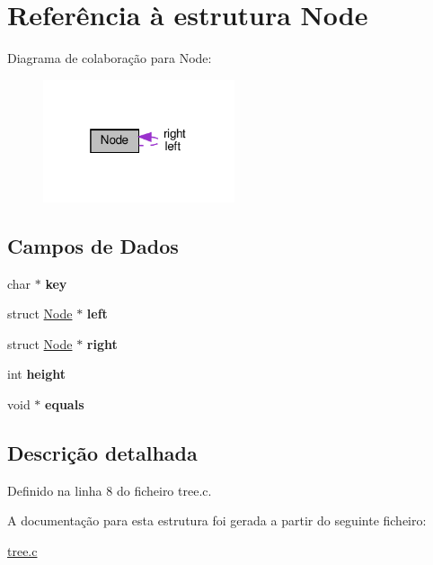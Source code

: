 \hypertarget{structNode}{}\section{Referência à estrutura Node}
\label{structNode}


Diagrama de colaboração para Node\+:
\nopagebreak
\begin{figure}[H]
\begin{center}
\leavevmode
\includegraphics[width=160pt]{structNode__coll__graph}
\end{center}
\end{figure}
\subsection*{Campos de Dados}
\begin{DoxyCompactItemize}
\item 
\mbox{\label{structNode_ad88c9a757bfafd5ff265e0837b150056}} 
char $\ast$ {\bfseries key}
\item 
\mbox{\label{structNode_ad0976834843c7618677d22a10c495b36}} 
struct \hyperlink{structNode}{Node} $\ast$ {\bfseries left}
\item 
\mbox{\label{structNode_af99e7102380da88d7c079fa264230cf4}} 
struct \hyperlink{structNode}{Node} $\ast$ {\bfseries right}
\item 
\mbox{\label{structNode_a61966b207f0584aaa4773e5e1266e905}} 
int {\bfseries height}
\item 
\mbox{\label{structNode_ae08b9529cb7cc71350c9cd80733ded0e}} 
void $\ast$ {\bfseries equals}
\end{DoxyCompactItemize}


\subsection{Descrição detalhada}


Definido na linha 8 do ficheiro tree.\+c.



A documentação para esta estrutura foi gerada a partir do seguinte ficheiro\+:\begin{DoxyCompactItemize}
\item 
\hyperlink{tree_8c}{tree.\+c}\end{DoxyCompactItemize}
